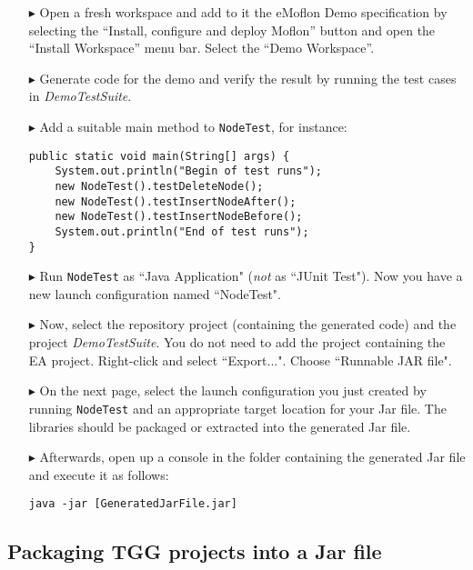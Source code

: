 \begin{itemize}
    
\item[$\blacktriangleright$] 
Open a fresh workspace and add to it the eMoflon Demo specification by selecting the ``Install, configure and deploy Moflon'' button and open the  ``Install Workspace'' menu bar. Select the ``Demo Workspace''.
    
\item[$\blacktriangleright$]
Generate code for the demo and verify the result by running the test cases in \emph{DemoTestSuite}.

\item[$\blacktriangleright$]
Add a suitable main method to \texttt{NodeTest}, for instance:
\begin{lstlisting}
public static void main(String[] args) {
    System.out.println("Begin of test runs");
    new NodeTest().testDeleteNode();
    new NodeTest().testInsertNodeAfter();
    new NodeTest().testInsertNodeBefore();
    System.out.println("End of test runs");
}
\end{lstlisting}

\item[$\blacktriangleright$]
Run \texttt{NodeTest} as ``Java Application" (\emph{not} as ``JUnit Test").
Now you have a new launch configuration named ``NodeTest".

\item[$\blacktriangleright$]
Now, select the repository project (containing the generated code) and the project \emph{DemoTestSuite}.
You do not need to add the project containing the EA project.
Right-click and select ``Export...".
Choose ``Runnable JAR file".
  
\item[$\blacktriangleright$]
On the next page, select the launch configuration you just created by running \texttt{NodeTest} and an appropriate target location for your Jar file.
The libraries should be packaged or extracted into the generated Jar file.

\item[$\blacktriangleright$]
Afterwards, open up a console in the folder containing the generated Jar file and execute it as follows:
\begin{lstlisting}
java -jar [GeneratedJarFile.jar]
\end{lstlisting}

    
\end{itemize}

\subsection{Packaging TGG projects into a Jar file}

